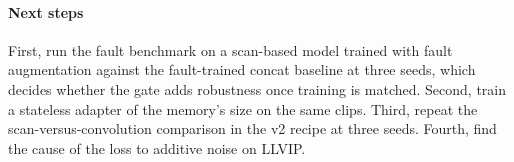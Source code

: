 \paragraph{Next steps}
First, run the fault benchmark on a scan-based model trained with fault augmentation against the fault-trained concat baseline at three seeds, which decides whether the gate adds robustness once training is matched. Second, train a stateless adapter of the memory's size on the same clips. Third, repeat the scan-versus-convolution comparison in the v2 recipe at three seeds. Fourth, find the cause of the loss to additive noise on LLVIP.
